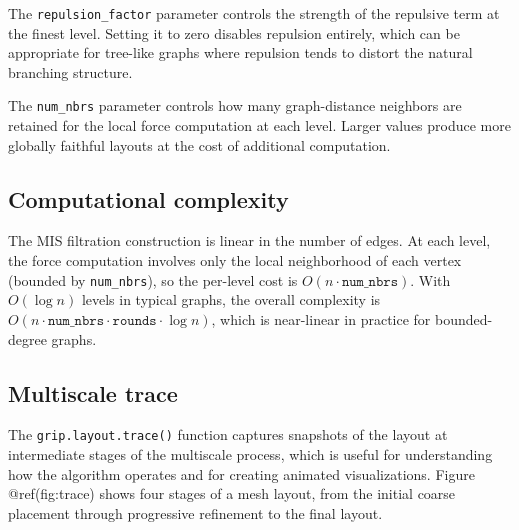 The \texttt{repulsion\_factor} parameter controls the strength of the repulsive term
at the finest level. Setting it to zero disables repulsion entirely, which
can be appropriate for tree-like graphs where repulsion tends to distort the
natural branching structure.

The \texttt{num\_nbrs} parameter controls how many graph-distance neighbors are
retained for the local force computation at each level. Larger values produce
more globally faithful layouts at the cost of additional computation.

\subsection{Computational complexity}\label{computational-complexity}

The MIS filtration construction is linear in the number of edges. At each
level, the force computation involves only the local neighborhood of each
vertex (bounded by \texttt{num\_nbrs}), so the per-level cost is \(O(n \cdot
\texttt{num\_nbrs})\). With \(O(\log n)\) levels in typical graphs, the overall
complexity is \(O(n \cdot \texttt{num\_nbrs} \cdot \texttt{rounds} \cdot \log
n)\), which is near-linear in practice for bounded-degree graphs.

\subsection{Multiscale trace}\label{multiscale-trace}

The \texttt{grip.layout.trace()} function captures snapshots of the layout at
intermediate stages of the multiscale process, which is useful for
understanding how the algorithm operates and for creating animated
visualizations. Figure @ref(fig:trace) shows four stages of a mesh layout,
from the initial coarse placement through progressive refinement to the
final layout.


